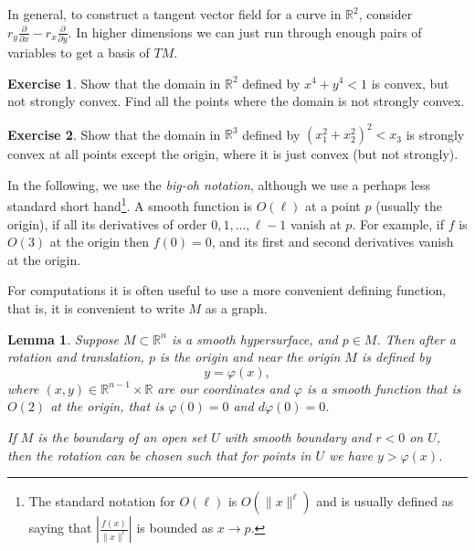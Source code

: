 \documentclass[12pt,openany]{book}
\newcommand{\snorm}[1]{\lVert {#1} \rVert}
\newcommand{\abs}[1]{\left\lvert {#1} \right\rvert}
\newcommand{\R}{{\mathbb{R}}}
\newcommand{\myindex}[1]{#1\index{#1}}
\theoremstyle{plain}
\newtheorem{lemma}[thm]{Lemma}
\theoremstyle{remark}
\theoremstyle{definition}
\newenvironment{exbox}{%
    \def\FrameCommand{\vrule width 1pt \relax\hspace {10pt}}%
    \MakeFramed {\advance \hsize -\width \FrameRestore }%
}{%
    \endMakeFramed
}
\theoremstyle{exercise}
\newtheorem{exercise}{Exercise}[section]
\theoremstyle{example}
\begin{document}
In general, to construct a tangent vector field for
a curve in $\R^2$,
consider
$r_y \frac{\partial}{\partial x} - r_x \frac{\partial}{\partial y}$.  In
higher dimensions we can just run through enough pairs of variables to get
a basis of $TM$.

\pagebreak[2]
\begin{exbox}
\begin{exercise}
Show that the domain in $\R^2$ defined by $x^4+y^4 < 1$ is convex, but not strongly convex.
Find all the points where the domain is not strongly convex.
\end{exercise}

\begin{exercise}
Show that the domain in $\R^3$ defined by ${(x_1^2+x_2^2)}^2 < x_3$ is
strongly convex at all points except the origin, where it is just convex
(but not strongly).
\end{exercise}
\end{exbox}

In the following, %
we use the \emph{\myindex{big-oh notation}},
although we use a perhaps less standard short hand\footnote{%
The standard notation for $O(\ell)$ is $O(\snorm{x}^{\ell})$ and
is usually defined as saying that
$\abs{\frac{f(x)}{\snorm{x}^\ell}}$ is bounded as $x \to p$.}.
A smooth function is $O(\ell)$ at a point $p$ (usually the origin),
if all its derivatives of order $0, 1, \ldots,  \ell-1$ vanish at $p$.
For example, if $f$ is $O(3)$ at the origin
then $f(0)=0$, and its first and second derivatives vanish at the origin.

For computations it is often useful to use a more convenient
defining function, that is, it is convenient to write $M$ as a graph.

\begin{lemma} \label{lemma:realgraphcoords}
Suppose $M \subset \R^n$ is a smooth hypersurface, 
and $p \in M$.  Then after a rotation and translation, 
$p$ is the origin and near the origin $M$ is defined by
\begin{equation*}
y = \varphi(x) ,
\end{equation*}
where $(x,y) \in \R^{n-1} \times \R$ are our coordinates and
$\varphi$ is a smooth %
function that is $O(2)$ at the origin,
that is $\varphi(0) = 0$ and $d\varphi(0) = 0$.

If $M$ is the boundary of an open set $U$ with smooth boundary and
$r < 0$ on $U$,
then the rotation can be chosen
such that for points in $U$ we have $y > \varphi(x)$.
\end{lemma}
\end{document}
